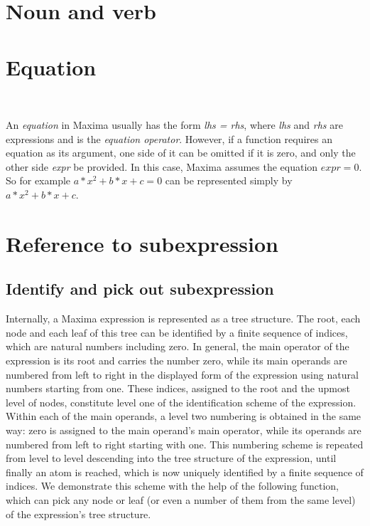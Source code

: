 \documentclass[../Maxima_Workbook.tex]{subfiles}
\begin{document}
\section{Noun and verb}

\section{Equation}\label{Ex1}

\lz {} \hfill \tcr{[equation]}\index{=} \\
 \hfill \tcr{[equation]}

\lz An \emph{equation}  in Maxima usually has the form \emph{lhs = rhs}, where \emph{lhs} and \emph{rhs} are expressions and \hyl{=}{\emph{=}} is the \emph{equation operator}. However, if a function requires an equation as its argument, one side of it can be omitted if it is zero, and only the other side \emph{expr} be provided. In this case, Maxima assumes the equation $ expr=0 $. So for example $ a*x^2+b*x+c=0 $ can be represented simply by $ a*x^2+b*x+c $.

\section{Reference to subexpression}

\subsection{Identify and pick out subexpression}

Internally, a Maxima expression is represented as a tree structure. The root, each node and each leaf of this tree can be identified by a finite sequence of indices, which are natural numbers including zero. In general, the main operator of the expression is its root and carries the number zero, while its main operands are numbered from left to right in the displayed form of the expression using natural numbers starting from one. These indices, assigned to the root and the upmost level of nodes, constitute level one of the identification scheme of the expression. Within each of the main operands, a level two numbering is obtained in the same way: zero is assigned to the main operand's main operator, while its operands are numbered from left to right starting with one. This numbering scheme is repeated from level to level descending into the tree structure of the expression, until finally an atom is reached, which is now uniquely identified by a finite sequence of indices. We demonstrate this scheme with the help of the following function, which can pick any node or leaf (or even a number of them from the same level) of the expression's tree structure. 
\end{document}
